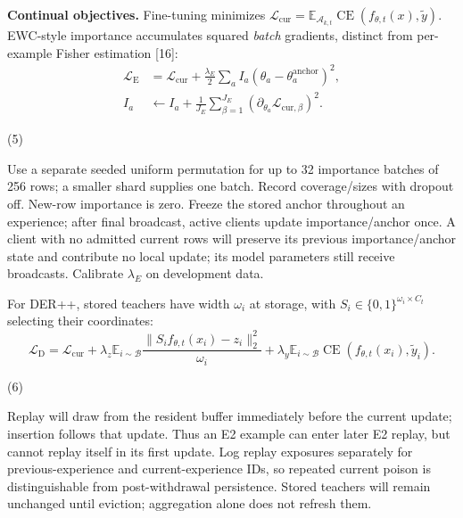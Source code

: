 \documentclass[10pt,a4paper]{article}
\newcommand{\CE}{\operatorname{CE}}
\begin{document}
\textbf{Continual objectives.} Fine-tuning minimizes $\mathcal L_{\mathrm{cur}}=\mathbb E_{\mathcal A_{k,t}}\CE(f_{\theta,t}(x),\widetilde y)$. EWC-style importance accumulates squared \emph{batch} gradients, distinct from per-example Fisher estimation [16]:
\begin{equation}
\begin{aligned}
\mathcal L_{\mathrm{E}}&=\mathcal L_{\mathrm{cur}}+\frac{\lambda_E}{2}\sum_aI_a(\theta_a-\theta_a^{\mathrm{anchor}})^2,\\
I_a&\leftarrow I_a+\frac1{J_E}\sum_{\beta=1}^{J_E}(\partial_{\theta_a}\mathcal L_{{\mathrm{cur}},\beta})^2.
\end{aligned}

\end{equation}
\par\hfill(5)\par

Use a separate seeded uniform permutation for up to 32 importance batches of 256 rows; a smaller shard supplies one batch. Record coverage/sizes with dropout off. New-row importance is zero. Freeze the stored anchor throughout an experience; after final broadcast, active clients update importance/anchor once. A client with no admitted current rows will preserve its previous importance/anchor state and contribute no local update; its model parameters still receive broadcasts. Calibrate $\lambda_E$ on development data.

For DER++, stored teachers have width $\omega_i$ at storage, with $S_i\in\{0,1\}^{\omega_i\times C_t}$ selecting their coordinates:
\begin{equation}
\mathcal L_{\mathrm{D}}=\mathcal L_{\mathrm{cur}}
+\lambda_z\mathbb E_{i\sim\mathcal B}\frac{\|S_if_{\theta,t}(x_i)-z_i\|_2^2}{\omega_i}
+\lambda_y\mathbb E_{i\sim\mathcal B}\CE(f_{\theta,t}(x_i),\widetilde y_i).

\end{equation}
\par\hfill(6)\par

Replay will draw from the resident buffer immediately before the current update; insertion follows that update. Thus an E2 example can enter later E2 replay, but cannot replay itself in its first update. Log replay exposures separately for previous-experience and current-experience IDs, so repeated current poison is distinguishable from post-withdrawal persistence. Stored teachers will remain unchanged until eviction; aggregation alone does not refresh them.
\end{document}
